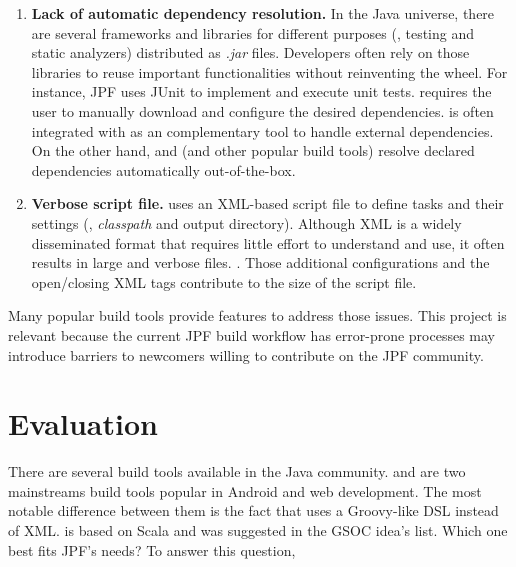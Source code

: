 \documentclass[a4paper, 12pt]{article}
\begin{document}
\begin{enumerate}

\item \textbf{Lack of automatic dependency resolution.}
In the Java universe, there are several frameworks and libraries for different
purposes (\eg, testing and static analyzers) distributed as \emph{.jar} files.
Developers often rely on those libraries to reuse important functionalities
without reinventing the wheel.
For instance, JPF uses JUnit to implement and execute unit tests.
\ant{} requires the user to manually download and configure the desired
dependencies.
\ant{} is often integrated with \ivy{}\cite{page:ivy} as an complementary
tool to handle external dependencies.
On the other hand, \gradle{} and \maven{} (and other popular build tools)
resolve declared dependencies automatically out-of-the-box.

\item \textbf{Verbose script file.}
\ant{} uses an XML-based script file to define tasks and their settings (\eg,
\emph{classpath} and output directory).
Although XML is a widely disseminated format that requires little effort to
understand and use, it often results in large and verbose files.
.
Those additional configurations and the open/closing XML tags contribute to the
size of the script file.

\end{enumerate}

Many popular build tools provide features to address those issues.
This project is relevant because the current JPF build workflow has error-prone
processes may introduce barriers to newcomers willing to contribute on the JPF
community.

\section{Evaluation}
\label{sec:evaluation}


There are several build tools available in the Java community.
\maven{} and \gradle{} are two mainstreams build tools popular in Android and
web development.
The most notable difference between them is the fact that \gradle{} uses a
Groovy-like DSL instead of XML.
\sbt{}\cite{page:sbt} is based on Scala and was suggested in the GSOC idea's
list\cite{page:jpf-gsoc18}.
Which one best fits JPF's needs?
To answer this question, 
\end{document}
